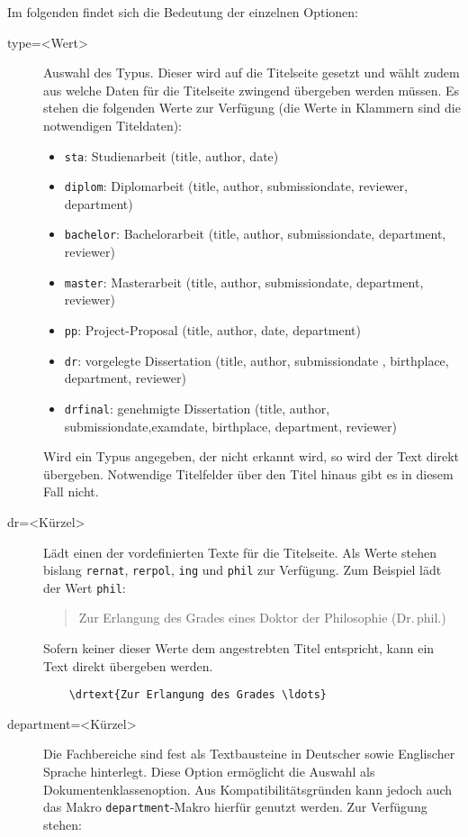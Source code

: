 \documentclass[
	german,%
	ruledheaders=chapter,%
	class=book,%
	thesis={%
			type=dr,
			dr=rernat
		},
	fontsize=11pt,%
	parskip=half-,%
	custommargins=true,%
	marginpar=false,%
	accentcolor=9c,%
]{tudapub}
\let\code\texttt
\begin{document}
Im folgenden findet sich die Bedeutung der einzelnen Optionen:
\begin{description}
	\item[type=<Wert>] Auswahl des Typus. Dieser wird auf die Titelseite gesetzt und wählt zudem aus welche Daten für die Titelseite zwingend übergeben werden müssen.
	      Es stehen die folgenden Werte zur Verfügung (die Werte in Klammern sind die notwendigen Titeldaten):
	      \begin{itemize}
		      \item \code{sta}: Studienarbeit (title, author, date)
		      \item \code{diplom}: Diplomarbeit (title, author, submissiondate, reviewer, department)
		      \item \code{bachelor}: Bachelorarbeit (title, author, submissiondate, department, reviewer)
		      \item \code{master}: Masterarbeit (title, author, submissiondate, department, reviewer)
		      \item \code{pp}: Project-Proposal  (title, author, date, department)
		      \item \code{dr}: vorgelegte Dissertation (title, author, submissiondate , birthplace, department, reviewer)
		      \item \code{drfinal}: genehmigte Dissertation (title, author, submissiondate,examdate, birthplace, department, reviewer)
	      \end{itemize}
	      Wird ein Typus angegeben, der nicht erkannt wird, so wird der Text direkt übergeben. Notwendige Titelfelder über den Titel hinaus gibt es in diesem Fall nicht.
	\item[dr=<Kürzel>] Lädt einen der vordefinierten Texte für die Titelseite. Als Werte stehen bislang \code{rernat}, \code{rerpol}, \code{ing} und \code{phil} zur Verfügung. Zum Beispiel lädt der Wert \code{phil}:
	      \begin{quote}
		      Zur Erlangung des Grades eines Doktor der Philosophie (Dr.\,phil.)
	      \end{quote}
	      Sofern keiner dieser Werte dem angestrebten Titel entspricht, kann ein Text direkt übergeben werden.
\begin{verbatim}
    \drtext{Zur Erlangung des Grades \ldots}
\end{verbatim}
	\item[department=<Kürzel>] Die Fachbereiche sind fest als Textbausteine in Deutscher sowie Englischer Sprache hinterlegt. Diese Option ermöglicht die Auswahl als Dokumentenklassenoption. Aus Kompatibilitätsgründen kann jedoch auch das Makro \code{department}-Makro hierfür genutzt werden. Zur Verfügung stehen:\par

\end{description}
\end{document}
